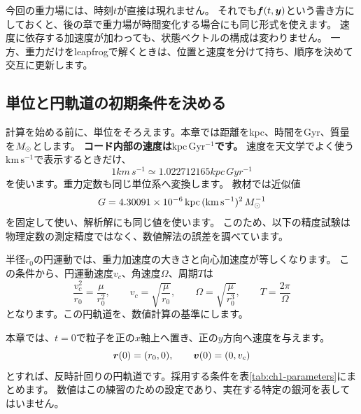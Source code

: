 今回の重力場には、時刻$t$が直接は現れません。
それでも$\boldsymbol f(t,\boldsymbol y)$という書き方にしておくと、後の章で重力場が時間変化する場合にも同じ形式を使えます。
速度に依存する加速度が加わっても、状態ベクトルの構成は変わりません。
一方、重力だけをleapfrogで解くときは、位置と速度を分けて持ち、順序を決めて交互に更新します。

\subsection{単位と円軌道の初期条件を決める}

計算を始める前に、単位をそろえます。本章では距離をkpc、時間をGyr、質量を$M_\odot$とします。
\textbf{コード内部の速度は$\mathrm{kpc\,Gyr^{-1}}$です。}
速度を天文学でよく使う$\mathrm{km\,s^{-1}}$で表示するときだけ、
\begin{equation}
1\unit{km\,s^{-1}}\simeq1.022712165\unit{kpc\,Gyr^{-1}}
\label{eq:ch1-velocity-conversion}
\end{equation}
を使います。重力定数も同じ単位系へ変換します。
教材では近似値
\begin{equation*}
G=4.30091\times10^{-6}\,\mathrm{kpc\,(km\,s^{-1})^2}\,M_\odot^{-1}
\end{equation*}
を固定して使い、解析解にも同じ値を使います。
このため、以下の精度試験は物理定数の測定精度ではなく、数値解法の誤差を調べています。

半径$r_0$の円運動では、重力加速度の大きさと向心加速度が等しくなります。
この条件から、円運動速度$v_c$、角速度$\Omega$、周期$T$は
\begin{equation}
\frac{v_c^2}{r_0}=\frac{\mu}{r_0^2},\qquad
v_c=\sqrt{\frac{\mu}{r_0}},\qquad
\Omega=\sqrt{\frac{\mu}{r_0^3}},\qquad
T=\frac{2\pi}{\Omega}
\label{eq:ch1-circular-orbit}
\end{equation}
となります。この円軌道を、数値計算の基準にします。

本章では、$t=0$で粒子を正の$x$軸上へ置き、正の$y$方向へ速度を与えます。
\begin{equation}
\boldsymbol r(0)=(r_0,0),\qquad \boldsymbol v(0)=(0,v_c)
\label{eq:ch1-initial-condition}
\end{equation}
とすれば、反時計回りの円軌道です。採用する条件を表\ref{tab:ch1-parameters}にまとめます。
数値はこの練習のための設定であり、実在する特定の銀河を表してはいません。

